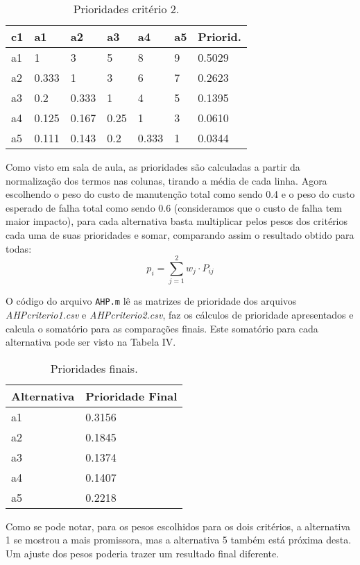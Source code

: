 \begin{table}[h]
	\centering
	\begin{tabular}{ | l | l | l | l | l | l | l | }
		\hline
		c1 & a1 & a2 & a3 & a4 & a5 & Priorid. \\ \hline
		a1 & 1 & 3 & 5 & 8 & 9 & 0.5029 \\ \hline
		a2 & 0.333 & 1 & 3 & 6 & 7 & 0.2623 \\ \hline
		a3 & 0.2 & 0.333 & 1 & 4 & 5 & 0.1395 \\ \hline
		a4 & 0.125 & 0.167 & 0.25 & 1 & 3 & 0.0610 \\ \hline
		a5 & 0.111 & 0.143 & 0.2 & 0.333 & 1 & 0.0344 \\ \hline
	\end{tabular}
	\label{table:c2}
	\caption{Prioridades critério 2.}
\end{table}
\newpage
Como visto em sala de aula, as prioridades são calculadas a partir da normalização dos termos nas colunas, tirando a média de cada linha. Agora escolhendo o peso do custo de manutenção total como sendo 0.4 e o peso do custo esperado de falha total como sendo 0.6 (consideramos que o custo de falha tem maior impacto), para cada alternativa basta multiplicar pelos pesos dos critérios cada uma de suas prioridades e somar, comparando assim o resultado obtido para todas:
\begin{equation}
p_i = \sum_{j=1}^{2} w_j \cdot P_{ij}
\end{equation}

O código do arquivo \texttt{AHP.m} lê as matrizes de prioridade dos arquivos \textit{AHPcriterio1.csv} e \textit{AHPcriterio2.csv}, faz os cálculos de prioridade apresentados e calcula o somatório para as comparações finais. Este somatório para cada alternativa pode ser visto na Tabela IV.
\begin{table}[h]
	\centering
	\begin{tabular}{ | l | l | }
		\hline
		Alternativa & Prioridade Final \\ \hline
		a1 & 0.3156 \\ \hline
		a2 & 0.1845 \\ \hline
		a3 & 0.1374 \\ \hline
		a4 & 0.1407 \\ \hline
		a5 & 0.2218 \\ \hline
	\end{tabular}
	\label{table:ahp-result}
	\caption{Prioridades finais.}
\end{table}

\newpage

Como se pode notar, para os pesos escolhidos para os dois critérios, a alternativa 1 se mostrou a mais promissora, mas a alternativa 5 também está próxima desta. Um ajuste dos pesos poderia trazer um resultado final diferente.